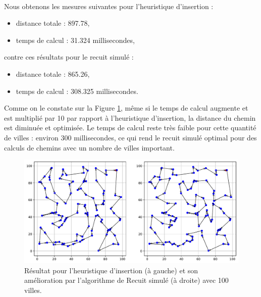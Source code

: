 \documentclass[a4paper,11pt,fleqn]{article}
\begin{document}
\paragraph{}
Nous obtenons les mesures suivantes pour l'heuristique d'insertion : 
\begin{itemize}[noitemsep,topsep=5pt]
    \item distance totale : 897.78,
    \item temps de calcul : 31.324 millisecondes,
\end{itemize} 
contre ces résultats pour le recuit simulé :
\begin{itemize}[noitemsep,topsep=5pt]
    \item distance totale : 865.26,
    \item temps de calcul : 308.325 millisecondes.
\end{itemize}
Comme on le constate sur la Figure \ref{fig:recuit}, même si le temps de calcul augmente et est multiplié par 10 par rapport à l'heuristique d'insertion, la distance du chemin est diminuée et optimisée. Le temps de calcul reste très faible pour cette quantité de villes : environ 300 millisecondes, ce qui rend le recuit simulé optimal pour des calculs de chemins avec un nombre de villes important.
\begin{figure}[H]
    \centering
    \includegraphics[width=\textwidth]{images/recuit_simule.pdf}
    \caption{Résultat pour l'heuristique d'insertion (à gauche) et son amélioration par l'algorithme de Recuit simulé (à droite) avec 100 villes.}
    \label{fig:recuit}
\end{figure}
\end{document}
